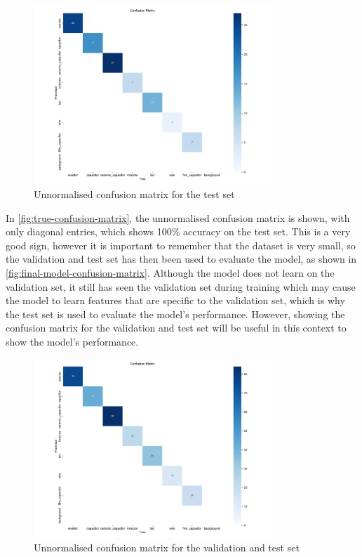\begin{figure}[H]
  \centering
  \includegraphics[width=0.8\textwidth]{imgs/graphs/confusion_matrix_final.png}
  \caption{Unnormalised confusion matrix for the test set}
  \label{fig:true-confusion-matrix}
\end{figure}

In \autoref{fig:true-confusion-matrix}, the unnormalised confusion matrix is shown, with only diagonal entries, which shows 100\% accuracy on the test set. This is a very good sign, however it is important to remember that the dataset is very small, so the validation and test set has then been used to evaluate the model, as shown in \autoref{fig:final-model-confusion-matrix}. Although the model does not learn on the validation set, it still has seen the validation set during training which may cause the model to learn features that are specific to the validation set, which is why the test set is used to evaluate the model's performance. However, showing the confusion matrix for the validation and test set will be useful in this context to show the model's performance.

\begin{figure}[H]
  \centering
  \includegraphics[width=0.8\textwidth]{imgs/graphs/confusion_matrix_final_valtest.png}
  \caption{Unnormalised confusion matrix for the validation and test set}
  \label{fig:final-model-confusion-matrix}
\end{figure}

